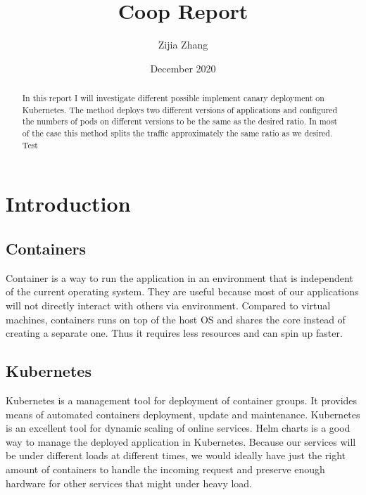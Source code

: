 \documentclass{article}
\title{Coop Report}
\author{Zijia Zhang }
\date{December 2020}
\begin{document}
\maketitle



\begin{abstract}
    In this report I will investigate different possible implement canary deployment on Kubernetes. The method deploys two different versions of applications and configured the numbers of pods on different versions to be the same as the desired ratio. In most of the case this method splits the traffic approximately the same ratio as we desired. Test
\end{abstract}

\tableofcontents

\pagebreak

\section{Introduction}
\subsection{Containers}
Container is a way to run the application in an environment that is independent of the current operating system. They are useful because most of our applications will not directly interact with others via environment. Compared to virtual machines, containers runs on top of the host OS and shares the core instead of creating a separate one. Thus it requires less resources and can spin up faster. 
\subsection{Kubernetes}
Kubernetes is a management tool for deployment of container groups. It provides means of automated containers deployment, update and maintenance. Kubernetes is an excellent tool for dynamic scaling of online services. Helm charts is a good way to manage the deployed application in Kubernetes. Because our services will be under different loads at different times, we would ideally have just the right amount of containers to handle the incoming request and preserve enough hardware for other services that might under heavy load.
\end{document}
